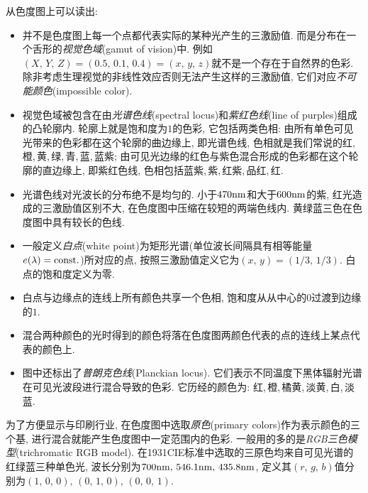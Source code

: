 从色度图上可以读出:

\begin{itemize}
\item 并不是色度图上每一个点都代表实际的某种光产生的三激励值. 而是分布在一个舌形的\emph{视觉色域}(gamut of vision)中. 例如$(X,\,Y,\,Z)=(0.5,\,0.1,\,0.4)=(x,\,y,\,z)$就不是一个存在于自然界的色彩. 除非考虑生理视觉的非线性效应否则无法产生这样的三激励值, 它们对应\emph{不可能颜色}(impossible color).
\item 视觉色域被包含在由\emph{光谱色线}(spectral locus)和\emph{紫红色线}(line of purples)组成的凸轮廓内. 轮廓上就是饱和度为$1$的色彩, 它包括两类色相: 由所有单色可见光带来的色彩都在这个轮廓的曲边缘上, 即光谱色线, 色相就是我们常说的红, 橙,\,黄,\,绿,\,青,\,蓝,\,蓝紫; 由可见光边缘的红色与紫色混合形成的色彩都在这个轮廓的直边缘上, 即紫红色线, 色相包括蓝紫,\,紫,\,红紫,\,品红,\,红.
\item 光谱色线对光波长的分布绝不是均匀的. 小于$470{\rm nm}$和大于$600{\rm nm}$的紫, 红光造成的三激励值区别不大, 在色度图中压缩在较短的两端色线内. 黄绿蓝三色在色度图中具有较长的色线.
\item 一般定义\emph{白点}(white point)为矩形光谱(单位波长间隔具有相等能量$e(\lambda)={\rm const.}$)所对应的点, 按照三激励值定义它为$(x,\,y)=(1/3,\,1/3)$. 白点的饱和度定义为零.
\item 白点与边缘点的连线上所有颜色共享一个色相, 饱和度从从中心的$0$过渡到边缘的$1$.
\item 混合两种颜色的光时得到的颜色将落在色度图两颜色代表的点的连线上某点代表的颜色上.
\item 图中还标出了\emph{普朗克色线}(Planckian locus). 它们表示不同温度下黑体辐射光谱在可见光波段进行混合导致的色彩. 它历经的颜色为: 红,\,橙,\,橘黄,\,淡黄,\,白,\,淡蓝.
\end{itemize}

为了方便显示与印刷行业, 在色度图中选取\emph{原色}(primary colors)作为表示颜色的三个基, 进行混合就能产生色度图中一定范围内的色彩. 一般用的多的是\emph{RGB三色模型}(trichromatic RGB model). 在1931CIE标准中选取的三原色均来自可见光谱的红绿蓝三种单色光, 波长分别为$700{\rm nm},\,546.1{\rm nm},\,435.8{\rm nm}$, 定义其$(r,\,g,\,b)$值分别为$(1,\,0,\,0),\,(0,\,1,\,0),\,(0,\,0,\,1)$. 

